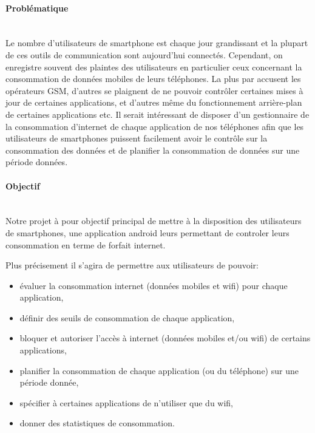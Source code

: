 \introduction
      \paragraph{}
      \small{
	}
    
    \paragraph{Problématique\\ \\}
    \small{ 
	 Le nombre d’utilisateurs de smartphone est chaque jour grandissant et la plupart de
ces outils de communication sont aujourd’hui connectés. Cependant, on enregistre souvent
des plaintes des utilisateurs en particulier ceux concernant la consommation de données
mobiles de leurs téléphones. La plus par accusent les opérateurs GSM, d’autres se plaignent de ne pouvoir contrôler certaines mises à jour de certaines applications, et d'autres même du fonctionnement arrière-plan de certaines applications etc. Il serait intéressant de disposer d’un gestionnaire de la consommation d’internet de chaque
application de nos téléphones afin que les utilisateurs de smartphones puissent facilement avoir le contrôle sur la consommation des données et de planifier la consommation de données sur une période données.
  
	}

    \paragraph{Objectif\\ \\}
    \small{ 
	  Notre projet à pour objectif principal de mettre à la disposition des utilisateurs de smartphones, une application android
	  leurs permettant de controler leurs consommation en terme de forfait internet.
      
	  Plus précisement il s'agira de permettre aux utilisateurs de pouvoir:
	
    \begin{itemize}
	\item évaluer la consommation internet (données mobiles et wifi) pour chaque application,
	\item définir des seuils de consommation de chaque application,
	\item bloquer et autoriser l'accès à internet (données mobiles et/ou wifi) de certains applications,
	\item planifier la consommation de chaque application (ou du téléphone) sur une période donnée,
        \item spécifier à certaines applications de n’utiliser que du wifi,
        \item donner des statistiques de consommation.
    \end{itemize}
    }

